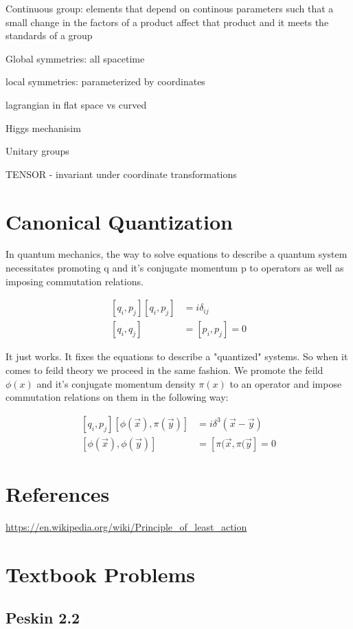 \documentclass[aps,secnumarabic,nobalancelastpage,amsmath,amssymb,
nofootinbib]{revtex4}
\begin{document}
Continuous group: elements that depend on continous parameters such that a small change in the factors of a product affect that product and it meets the standards of a group

Global symmetries: all spacetime

local symmetries: parameterized by coordinates

lagrangian in flat space vs curved

Higgs mechanisim

Unitary groups

TENSOR - invariant under coordinate transformations


\section{Canonical Quantization}

In quantum mechanics, the way to solve equations to describe a quantum system necessitates promoting q and it's conjugate momentum p to operators as well as imposing commutation relations. 

\begin{equation}
\begin{aligned}
[q_i,p_j][q_i,p_j] &= i \delta_{ij} \\
[q_i,q_j]&=[p_i,p_j]=0
\end{aligned}
\end{equation}


It just works. It fixes the equations to describe a "quantized" systems. So when it comes to feild theory we proceed in the same fashion. We promote the feild $\phi(x)$ and it's conjugate momentum density $\pi(x)$ to an operator and impose commutation relations on them in the following way:

 \begin{equation}
\begin{aligned}
[q_i,p_j][\phi(\vec{x}),\pi(\vec{y})] &= i \delta^3(\vec{x}-\vec{y}) \\
[\phi(\vec{x}),\phi(\vec{y})]&=[\pi(\vec{x},\pi(\vec{y}]=0
\end{aligned}
\end{equation}



\section{References}

\noindent
\url{https://en.wikipedia.org/wiki/Principle_of_least_action}

\section{Textbook Problems}

\subsection{Peskin 2.2}
\end{document}
